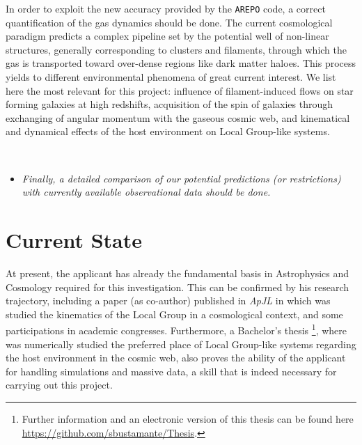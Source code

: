 \documentclass[a4,useAMS,usenatbib,usegraphicx,12pt]{article}
\begin{document}
In order to exploit the new accuracy provided by the \texttt{AREPO} code, a 
correct quantification of the gas dynamics should be done. The current 
cosmological paradigm predicts a complex pipeline set by the potential well of 
non-linear structures, generally corresponding to clusters and filaments, 
through which the gas is transported toward over-dense regions like dark matter 
haloes. This process yields to different environmental phenomena of great current 
interest. We list here the most relevant for this project: influence of 
filament-induced flows on star forming galaxies at high redshifts, acquisition of 
the spin of galaxies through exchanging of angular momentum with the gaseous 
cosmic web, and kinematical and dynamical effects of the host environment on Local 
Group-like systems.

\

\begin{itemize}

\item[\checkmark] \textit{Finally, a detailed comparison of our potential 
predictions (or restrictions) with currently available observational data
should be done.}

\end{itemize}



\section{Current State}


At present, the applicant has already the fundamental basis in Astrophysics and
Cosmology required for this investigation. This can be confirmed by his research 
trajectory, including a paper (as co-author) published in \textit{ApJL} in which 
was studied the kinematics of the Local Group in a cosmological context, and some
participations in academic congresses. Furthermore, a Bachelor's thesis
\footnote{Further information and an electronic version of this 
thesis can be found here \url{https://github.com/sbustamante/Thesis}.}, where was 
numerically studied the preferred place of Local Group-like systems regarding the 
host environment in the cosmic web, also proves the ability of the applicant for
handling simulations and massive data, a skill that is indeed necessary for 
carrying out this project.
\end{document}
